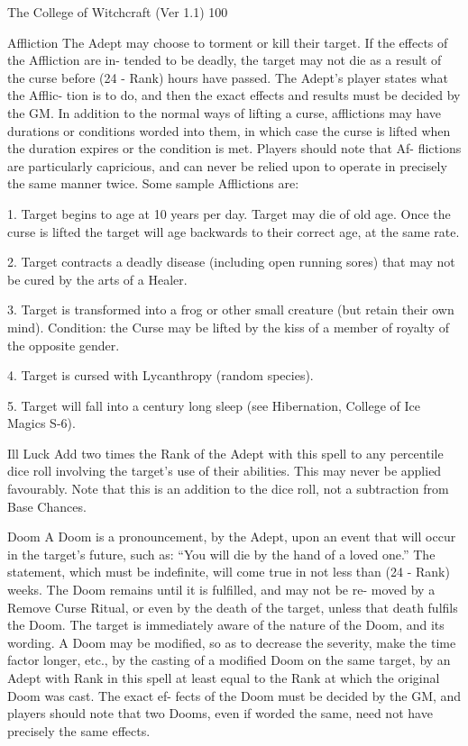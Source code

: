\begin{Chapter}{The College of Witchcraft (Ver 1.1)}
100 

Affliction The Adept may choose to torment or kill 
their  target.  If  the  effects  of  the  Affliction  are  in-
tended  to  be  deadly,  the  target  may  not  die  as  a 
result  of  the  curse  before  (24  -  Rank)  hours  have 
passed.  The  Adept’s  player  states  what  the  Afflic-
tion is to do, and then the exact effects and results 
must  be  decided  by  the  GM.  In  addition  to  the 
normal ways of lifting a curse, afflictions may have 
durations or conditions worded into them, in which 
case the curse is lifted when the duration expires or 
the  condition  is  met.  Players  should  note  that  Af-
flictions  are  particularly  capricious,  and  can  never 
be  relied  upon  to  operate  in  precisely  the  same 
manner twice. Some sample Afflictions are: 

1. Target begins to age at 10 years per day. Target 
may  die  of  old  age.  Once  the  curse  is  lifted  the 
target  will  age  backwards  to  their  correct  age,  at 
the same rate. 

2.  Target  contracts  a  deadly  disease  (including 
open  running  sores)  that  may  not  be  cured  by  the 
arts of a Healer. 

3.  Target  is  transformed  into a  frog  or  other  small 
creature (but retain their own mind). Condition: the 
Curse  may  be  lifted  by  the  kiss  of  a  member  of 
royalty of the opposite gender. 

4.  Target  is  cursed  with  Lycanthropy  (random 
species). 

5.  Target  will  fall  into  a  century  long  sleep  (see 
Hibernation, College of Ice Magics S-6). 

Ill Luck Add two times the Rank of the Adept with 
this  spell  to  any  percentile  dice  roll  involving  the 
target’s  use  of  their  abilities.  This  may  never  be 
applied favourably. Note that this is an addition to 
the dice roll, not a subtraction from Base Chances. 

Doom A Doom is a pronouncement, by the Adept, 
upon an event that will occur in the target’s future, 
such as: “You will die by the hand of a loved one.” 
The statement, which must be indefinite, will come 
true in not less than (24 - Rank) weeks. The Doom 
remains  until  it  is  fulfilled,  and  may  not  be  re-
moved  by  a  Remove  Curse  Ritual,  or  even  by  the 
death  of  the  target,  unless  that  death  fulfils  the 
Doom.  The  target  is  immediately  aware  of  the 
nature of the Doom, and its wording. A Doom may 
be  modified,  so  as  to  decrease  the  severity,  make 
the  time  factor  longer,  etc.,  by  the  casting  of  a 
modified  Doom  on  the  same  target,  by  an  Adept 
with Rank in this spell at least equal to the Rank at 
which  the  original  Doom  was  cast.  The  exact  ef-
fects of the Doom must be decided by the GM, and 
players  should  note  that  two  Dooms,  even  if 
worded the same, need not have precisely the same 
effects. 


\end{Chapter}
